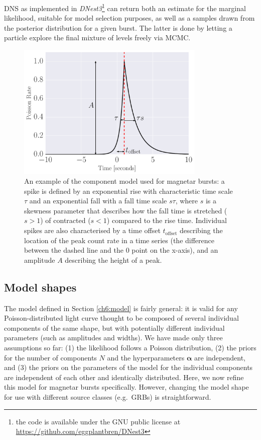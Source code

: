 \documentclass[12pt]{emulateapj}
\begin{document}
DNS as implemented in {\it DNest3}\footnote{the code is available under the GNU public license at \url{https://github.com/eggplantbren/DNest3}} can return both an estimate for the marginal likelihood,
suitable for model selection purposes, as well as a samples drawn from the posterior distribution for a given burst. The latter is done by letting a particle explore
the final mixture of levels freely via MCMC. 
\begin{figure}[h]
\begin{center}
\includegraphics[width=9cm]{f2.pdf}%
\caption{An example of the component model used for magnetar bursts: a spike is defined by an exponential rise with characteristic
time scale $\tau$ and an exponential fall with a fall time scale $s\tau$, where $s$ is a skewness parameter that describes how the fall
time is stretched ($s > 1$) of contracted ($s < 1$) compared to the rise time. Individual spikes are also characterised by a time offset
$t_{\mathrm{offset}}$ describing the location of the peak count rate in a time series (the difference between the dashed line and the 0 point
on the x-axis), and an amplitude $A$ describing the height of a peak.}
\label{fig:word_example}
\end{center}
\end{figure}



\subsection{Model shapes}
\label{ch6:wordmodel}

The model defined in Section \ref{ch6:model} is fairly general: it is valid for any Poisson-distributed light curve thought to be composed of several individual components of
the same shape, but with potentially different individual parameters (such as amplitudes and widths). 
We have made only three assumptions so far: (1) the likelihood follows a Poisson distribution, (2) the priors for the number of components $N$ and the hyperparameters $\bm{\alpha}$ are independent,
and (3) the priors on the parameters of the model for the individual components are independent of each other and identically distributed. 
Here, we now refine this model for magnetar bursts specifically. However, changing the model shape for use with different source classes (e.g.\ GRBs) is straightforward.
\end{document}

